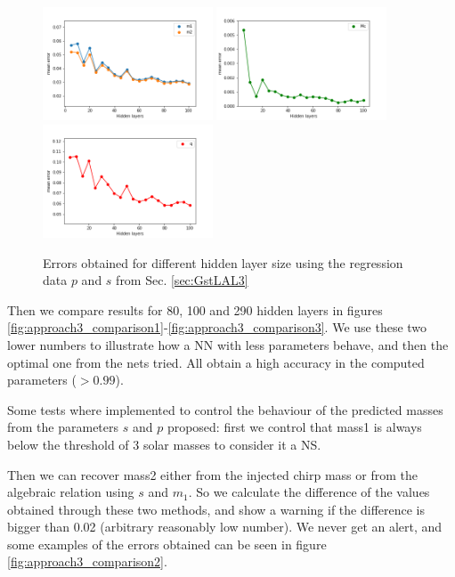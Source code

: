 \documentclass[prd,aps,twocolumn,a4paper,showkeys,nofootinbib]{article}
\begin{document}
\begin{figure}[]
  \center
  \includegraphics[width=0.45\textwidth]{./Figs/merrorwlayers}
  \includegraphics[width=0.45\textwidth]{./Figs/mcerrorwlayers}
  \includegraphics[width=0.45\textwidth]{./Figs/qerrorwlayers}
  \caption{\label{fig:error_with_layers} Errors obtained for different hidden layer size using the regression data $p$ and $s$ from Sec. \ref{sec:GstLAL3}}
\end{figure}

Then we compare results for 80, 100 and 290 hidden layers in figures  \ref{fig:approach3_comparison1}-\ref{fig:approach3_comparison3}. We use these two lower numbers to illustrate how a NN with less parameters behave, and then the optimal one from the nets tried. All  obtain a high accuracy in the computed parameters ($>0.99$). 

Some tests where implemented to control the behaviour of the predicted masses from the parameters $s$ and $p$ proposed: first we control that mass1 is always below the threshold of 3 solar masses to consider it a NS. 

Then we can recover mass2 either from the injected chirp mass or from the algebraic relation using $s$ and $m_1$. So we calculate the difference of the values obtained through these two methods, and show a warning if the difference is bigger than 0.02 (arbitrary reasonably low number). We never get an alert, and some examples of the errors obtained can be seen in figure \ref{fig:approach3_comparison2}.
\end{document}

